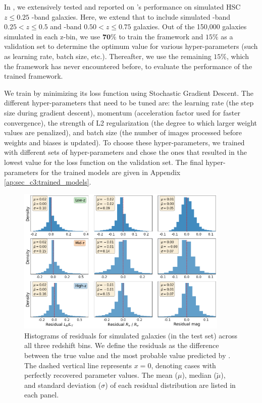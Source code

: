 In \citet{gampen_software_paper}, we extensively tested and reported on \gampen{}'s performance on simulated HSC $z \leq 0.25$ \gb{}-band galaxies. Here, we extend that to include simulated \rb{}-band $0.25 < z \leq 0.5$ and \ib{}-band $0.50 < z \leq 0.75$  galaxies. Out of the 150,000 galaxies simulated in each z-bin, we use $\mathbf{70\%}$ to train the framework and $15\%$ as a validation set to determine the optimum value for various hyper-parameters (such as learning rate, batch size, etc.). Thereafter, we use the remaining $15\%$, which the framework has never encountered before, to evaluate the performance of the trained framework. 

We train \gampen{} by minimizing its loss function using Stochastic Gradient Descent. The different hyper-parameters that need to be tuned are: the learning rate (the step size during gradient descent), momentum (acceleration factor used for faster convergence), the strength of L2 regularization (the degree to which larger weight values are penalized), and batch size (the number of images processed before weights and biases is updated). To choose these hyper-parameters, we trained \gampen{} with different sets of hyper-parameters and chose the ones that resulted in the lowest value for the loss function on the validation set. The final %
hyper-parameters for the trained models are given in Appendix \ref{ap:sec_c3:trained_models}.

\begin{figure}[htb]
    \centering
    \includegraphics[width = 0.9\textwidth]{err_hist_sim_all_z.png}
    \caption{Histograms of residuals for simulated galaxies (in the test set) across all three redshift bins. We define the residuals as the difference between the true value and the most probable value predicted by \gampen{}. The dashed vertical line represents $x = 0$, denoting cases with perfectly recovered parameter values. 
    The mean ($\mu$), median ($\tilde{\mu}$), and standard deviation ($\sigma$) of each residual distribution are listed in each panel.}
    \label{fig_c3:resi_sim_all_z}
\end{figure}

